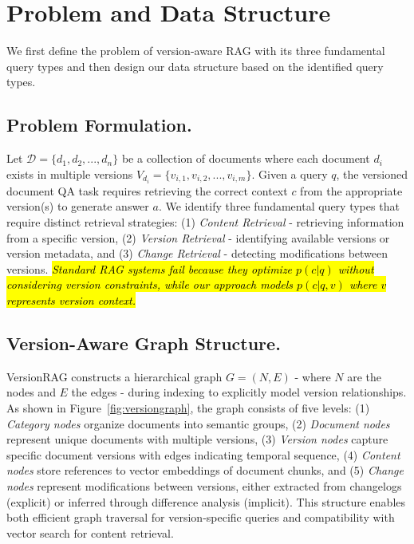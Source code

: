 \section{Problem and Data Structure}

We first define the problem of version-aware RAG with its three fundamental query types and then design our data structure based on the identified query types.

\subsection{Problem Formulation.}
\label{sub:problem}
Let $\mathcal{D} = \{d_1, d_2, ..., d_n\}$ be a collection of documents where each document $d_i$ exists in multiple versions $V_{d_i} = \{v_{i,1}, v_{i,2}, ..., v_{i,m}\}$. Given a query $q$, the versioned document QA task requires retrieving the correct context $c$ from the appropriate version(s) to generate answer $a$. We identify three fundamental query types that require distinct retrieval strategies: (1) \textit{Content Retrieval} - retrieving information from a specific version, (2) \textit{Version Retrieval} - identifying available versions or version metadata, and (3) \textit{Change Retrieval} - detecting modifications between versions. \hl{\textit{Standard RAG systems fail because they optimize $p(c|q)$ without considering version constraints, while our approach models $p(c|q,v)$ where $v$ represents version context.}}

\subsection{Version-Aware Graph Structure.}
VersionRAG constructs a hierarchical graph $G = (N, E)$ - where $N$ are the nodes and $E$ the edges - during indexing to explicitly model version relationships. As shown in Figure~\ref{fig:versiongraph}, the graph consists of five levels: (1) \textit{Category nodes} organize documents into semantic groups, (2) \textit{Document nodes} represent unique documents with multiple versions, (3) \textit{Version nodes} capture specific document versions with edges indicating temporal sequence, (4) \textit{Content nodes} store references to vector embeddings of document chunks, and (5) \textit{Change nodes} represent modifications between versions, either extracted from changelogs (explicit) or inferred through difference analysis (implicit). This structure enables both efficient graph traversal for version-specific queries and compatibility with vector search for content retrieval.

